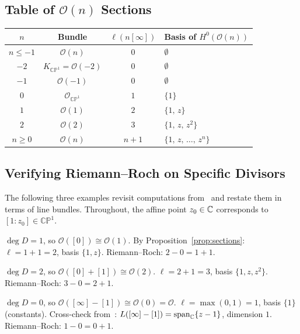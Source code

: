 \documentclass[11pt,openany]{article}
\newcommand{\CP}{\mathbb{CP}}
\newcommand{\CPone}{\CP^1}
\begin{document}
\subsection{Table of $\mathcal{O}(n)$ Sections}

\begin{center}
\renewcommand{\arraystretch}{1.3}
\begin{tabular}{c|c|c|l}
  \toprule
  $n$ & Bundle & $\ell(n[\infty])$ & Basis of $H^0(\mathcal{O}(n))$ \\
  \midrule
  $n\leq -1$ & $\mathcal{O}(n)$          & $0$   & $\emptyset$ \\
  $-2$       & $K_{\CPone}=\mathcal{O}(-2)$ & $0$  & $\emptyset$ \\
  $-1$       & $\mathcal{O}(-1)$          & $0$   & $\emptyset$ \\
  $0$        & $\mathcal{O}_{\CPone}$     & $1$   & $\{1\}$ \\
  $1$        & $\mathcal{O}(1)$           & $2$   & $\{1,\,z\}$ \\
  $2$        & $\mathcal{O}(2)$           & $3$   & $\{1,\,z,\,z^2\}$ \\
  $n\geq 0$  & $\mathcal{O}(n)$           & $n+1$ & $\{1,\,z,\,\ldots,\,z^n\}$ \\
  \bottomrule
\end{tabular}
\end{center}

\subsection{Verifying Riemann--Roch on Specific Divisors}

The following three examples revisit computations from~\cite{RR-CP1}
and restate them in terms of line bundles.
Throughout, the affine point $z_0\in\mathbb{C}$ corresponds to $[1:z_0]\in\CPone$.

\begin{example}[{$D=[0]$}]
$\deg D=1$, so $\mathcal{O}([0])\cong\mathcal{O}(1)$.
By Proposition~\ref{prop:sections}: $\ell=1+1=2$, basis $\{1,z\}$.
Riemann--Roch: $2-0=1+1$.\ \checkmark
\end{example}

\begin{example}[{$D=[0]+[1]$}]
$\deg D=2$, so $\mathcal{O}([0]+[1])\cong\mathcal{O}(2)$.
$\ell=2+1=3$, basis $\{1,z,z^2\}$.
Riemann--Roch: $3-0=2+1$.\ \checkmark
\end{example}

\begin{example}[{$D=[\infty]-[1]$}]
$\deg D=0$, so $\mathcal{O}([\infty]-[1])\cong\mathcal{O}(0)=\mathcal{O}$.
$\ell=\max(0,1)=1$, basis $\{1\}$ (constants).
Cross-check from~\cite{RR-CP1}: $L([\infty]-[1])=\operatorname{span}_{\mathbb{C}}\{z-1\}$,
dimension $1$.\ \checkmark
Riemann--Roch: $1-0=0+1$.\ \checkmark
\end{example}
\end{document}

